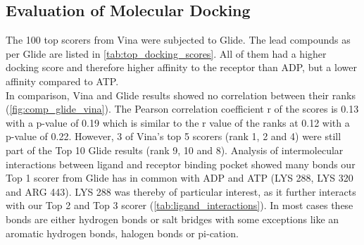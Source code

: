 \documentclass[11pt, letterpaper, titlepage]{article}
\begin{document}
\FloatBarrier

\subsection{Evaluation of Molecular Docking}
The 100 top scorers from Vina were subjected to Glide. The lead compounds as per Glide are listed in \autoref{tab:top_docking_scores}. All of them had a higher docking score and therefore higher affinity to the receptor than ADP, but a lower affinity compared to ATP.\\
In comparison, Vina and Glide results showed no correlation between their ranks (\autoref{fig:comp_glide_vina}). The Pearson correlation coefficient r of the scores is 0.13 with a p-value of 0.19 which is similar to the r value of the ranks at 0.12 with a p-value of 0.22. However, 3 of Vina's top 5 scorers (rank 1, 2 and 4) were still part of the Top 10 Glide results (rank 9, 10 and 8). 
Analysis of intermolecular interactions between ligand and receptor binding pocket showed many bonds our Top 1 scorer from Glide has in common with ADP and ATP (LYS 288, LYS 320 and ARG 443). LYS 288 was thereby of particular interest, as it further interacts with our Top 2 and Top 3 scorer (\autoref{tab:ligand_interactions}). In most cases these bonds are either hydrogen bonds or salt bridges with some exceptions like an aromatic hydrogen bonds, halogen bonds or pi-cation.
%

\end{document}
